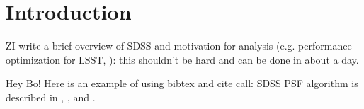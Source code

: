 \documentclass[12pt,preprint]{aastex}
\begin{document}





\section{Introduction}



ZI write a brief overview of SDSS and motivation for analysis (e.g. performance optimization
for LSST, \citealt{LSSToverview}): this shouldn't be hard and can be done in about a day. 

Hey Bo! Here is an example of using bibtex and cite call: SDSS PSF algorithm is described 
in \cite{Lupton2001}, \cite{Lupton2002}, and \citet[][see \S4.3]{SDSSEDR}.
\end{document}
